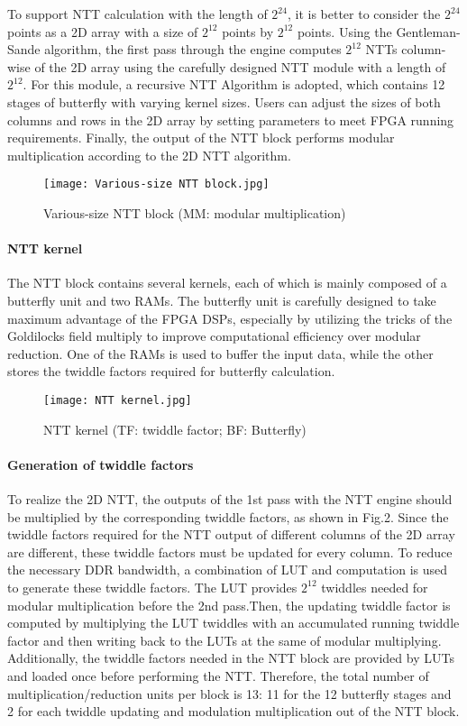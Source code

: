 To support NTT calculation with the length of $2^{24}$, it is better to consider the $2^{24}$ points as a 2D array with a size of $2^{12}$ points by $2^{12}$ points. Using the Gentleman-Sande algorithm, the first pass through the engine computes $2^{12}$ NTTs column-wise of the 2D array using the carefully designed NTT module with a length of $2^{12}$. For this module, a recursive NTT Algorithm is adopted, which contains 12 stages of butterfly with varying kernel sizes. Users can adjust the sizes of both columns and rows in the 2D array by setting parameters to meet FPGA running requirements. Finally, the output of the NTT block performs modular multiplication according to the 2D NTT algorithm.

\begin{figure}[ht]
  \centering
  \texttt{[image: Various-size NTT block.jpg]}
  \caption{Various-size NTT block (MM: modular multiplication)}
  \label{fig:NTT_module}
\end{figure}

\paragraph*{NTT kernel}
The NTT block contains several kernels, each of which is mainly composed of a butterfly unit and two RAMs. The butterfly unit is carefully designed to take maximum advantage of the FPGA DSPs, especially by utilizing the tricks of the Goldilocks field multiply to improve computational efficiency over modular reduction. One of the RAMs is used to buffer the input data, while the other stores the twiddle factors required for butterfly calculation.


\begin{figure}[ht]
  \centering
  \texttt{[image: NTT kernel.jpg]}
  \caption{NTT kernel (TF: twiddle factor; BF: Butterfly)}
  \label{fig:NTT_kernel}
\end{figure}

\paragraph*{Generation of twiddle factors}

To realize the 2D NTT, the outputs of the 1st pass with the NTT engine should be multiplied by the corresponding twiddle factors, as shown in Fig.2. Since the twiddle factors required for the NTT output of different columns of the 2D array are different, these twiddle factors must be updated for every column. To reduce the necessary DDR bandwidth, a combination of LUT and computation is used to generate these twiddle factors. The LUT provides  $2^{12}$ twiddles needed for modular multiplication before the 2nd pass.Then, the updating twiddle factor is computed by multiplying the LUT twiddles with an accumulated running twiddle factor and then writing back to the LUTs at the same of modular multiplying. Additionally, the twiddle factors needed in the NTT block are provided by LUTs and loaded once before performing the NTT. Therefore, the total number of multiplication/reduction units per block is 13: 11 for the 12 butterfly stages and 2 for each twiddle updating and modulation multiplication out of the NTT block.


